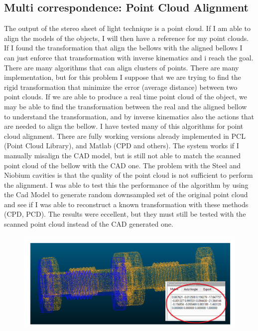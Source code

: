 \documentclass[12pt,a4paper]{article}
\begin{document}
\subsection{Multi correspondence: Point Cloud Alignment}
The output of the stereo sheet of light technique is a point cloud. If I am able to align the models of the objects, I will then have a reference for my point clouds. If I found the transformation that align the bellows with the aligned bellows I can just enforce that transformation with inverse kinematics and i reach the goal.
There are many algorithms that can align clusters of points. There are many implementation, but for this problem I suppose that we are trying to find the rigid transformation that minimize the error (average distance) between two point clouds. If we are able to produce a real time point cloud of the object, we may be able to find the transformation between the real and the aligned bellow to understand the transformation, and by inverse kinematics also the actions that are needed to align the bellow.
I have tested many of this algorithms for point cloud alignment. There are fully working versions already implemented in PCL (Point Cloud Library), and Matlab (CPD and others).
The system works if I manually misalign the CAD model, but is still not able to match the scanned point cloud of the bellow with the CAD one. 
The problem with the Steel and Niobium cavities is that the quality of the point cloud is not sufficient to perform the alignment. I was able to test this the performance of the algorithm by using the Cad Model to generate random downsampled set of the original point cloud and see if I was able to reconstruct a known transformation with these methods (CPD, PCD). The results were eccellent, but they must still be tested with the scanned point cloud instead of the CAD generated one.
\begin{figure}[h!]
\centering
\includegraphics[width=\textwidth]{36.png}
\end{figure}
\end{document}
